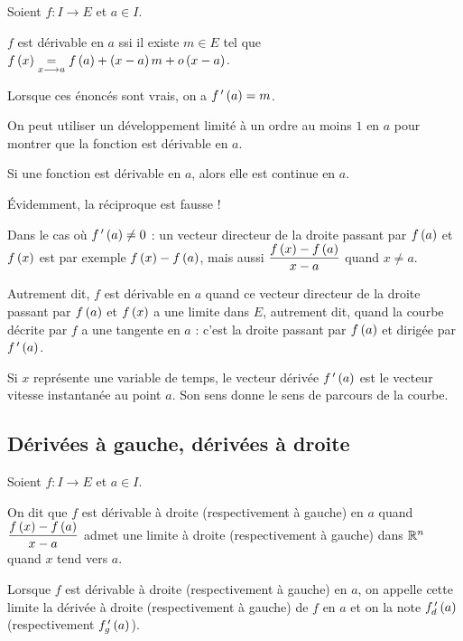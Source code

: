 \begin{prop}
Soient \(f:I\to E\) et \(a\in I\).

\(f\) est dérivable en \(a\) ssi il existe \(m\in E\) tel que \(f\left(x\right)\underset{x\longrightarrow a}{=}f\left(a\right)+\left(x-a\right)m+o\left(x-a\right)\).

Lorsque ces énoncés sont vrais, on a \(f^{\,\prime}\left(a\right)=m\).
\end{prop}

On peut utiliser un développement limité à un ordre au moins \(1\) en \(a\) pour montrer que la fonction est dérivable en \(a\).

\begin{prop}
Si une fonction est dérivable en \(a\), alors elle est continue en \(a\).
\end{prop}

\begin{rem}
Évidemment, la réciproque est fausse !
\end{rem}

Dans le cas où \(f^{\,\prime}\left(a\right)\not=0\) : un vecteur directeur de la droite passant par \(f\left(a\right)\) et \(f\left(x\right)\) est par exemple \(f\left(x\right)-f\left(a\right)\), mais aussi \(\dfrac{f\left(x\right)-f\left(a\right)}{x-a}\) quand \(x\not=a\).

Autrement dit, \(f\) est dérivable en \(a\) quand ce vecteur directeur de la droite passant par \(f\left(a\right)\) et \(f\left(x\right)\) a une limite dans \(E\), autrement dit, quand la courbe décrite par \(f\) a une tangente en \(a\) : c'est la droite passant par \(f\left(a\right)\) et dirigée par \(f^{\,\prime}\left(a\right)\).

Si \(x\) représente une variable de temps, le vecteur dérivée \(f^{\,\prime}\left(a\right)\) est le vecteur vitesse instantanée au point \(a\). Son sens donne le sens de parcours de la courbe.

\subsection{Dérivées à gauche, dérivées à droite}

\begin{defi}
Soient \(f:I\to E\) et \(a\in I\).

On dit que \(f\) est dérivable à droite (respectivement à gauche) en \(a\) quand \(\dfrac{f\left(x\right)-f\left(a\right)}{x-a}\) admet une limite à droite (respectivement à gauche) dans \(\mathbb{R}^n\) quand \(x\) tend vers \(a\).

Lorsque \(f\) est dérivable à droite (respectivement à gauche) en \(a\), on appelle cette limite la dérivée à droite (respectivement à gauche) de \(f\) en \(a\) et on la note \(f_d^{\,\prime}\left(a\right)\) (respectivement \(f_g^{\,\prime}\left(a\right)\)).
\end{defi}

